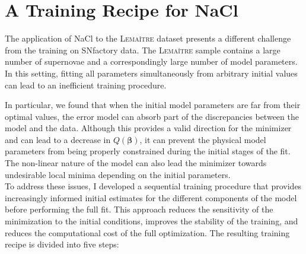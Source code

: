 \section{A Training Recipe for NaCl}

The application of NaCl to the \textsc{Lemaître} dataset presents a 
different challenge from the training on SNfactory data. The \textsc{Lemaître} 
sample contains a large number of supernovae and a correspondingly large 
number of model parameters. In this setting, fitting all 
parameters simultaneously from arbitrary initial values can lead to an 
inefficient training procedure. 

In particular, we found that when the initial model parameters are far from 
their optimal values, the error model can absorb part of the discrepancies 
between the model and the data. Although this provides a valid direction for 
the minimizer and can lead to a decrease in $Q(\boldsymbol{\beta})$, it can prevent the 
physical model parameters from being properly constrained during the initial 
stages of the fit. The non-linear nature of the model can also lead the 
minimizer towards undesirable local minima depending on the initial 
parameters. \\

To address these issues, I developed a sequential training procedure that 
provides increasingly informed initial estimates for the different components 
of the model before performing the full fit. This approach reduces the 
sensitivity of the minimization to the initial conditions, improves the 
stability of the training, and reduces the computational cost of the full 
optimization. The resulting training recipe is divided into five steps: 

